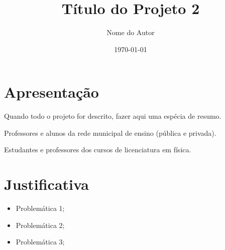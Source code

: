 \documentclass[12pt]{article}
\title{Título do Projeto 2}
\author{Nome do Autor}
\affil{Nome do Curso}
\date{\today}
\begin{document}
	
\maketitle
	













\section{Apresentação}

Quando todo o projeto for descrito, fazer aqui uma espécia de resumo.





\begin{description}[leftmargin=0.0ex]

\item[Comunidade externa beneficiada]
Professores e alunos da rede municipal de ensino (pública e privada).

\item[Comunidade interna beneficiada]
Estudantes e professores dos cursos de licenciatura em física.

\end{description}











\section{Justificativa}


\begin{itemize}[leftmargin=0.0ex,itemsep=0pt,parsep=0pt,partopsep=0pt] 
\item Problemática 1;
\item Problemática 2;
\item Problemática 3;
\end{itemize}
\end{document}
